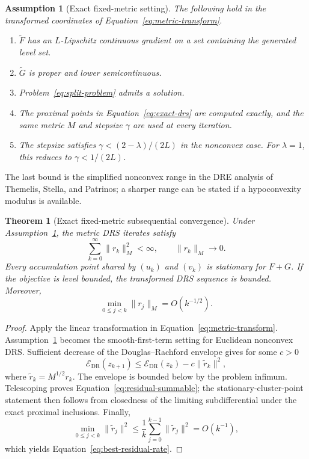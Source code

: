 \documentclass[11pt]{article}
\newtheorem{assumption}{Assumption}
\newtheorem{theorem}{Theorem}
\newcommand{\Edr}{\mathcal{E}_{\mathrm{DR}}}
\newcommand{\normM}[1]{\lVert #1\rVert_M}
\begin{document}
\begin{assumption}[Exact fixed-metric setting]
\label{ass:exact}
The following hold in the transformed coordinates of
Equation~\eqref{eq:metric-transform}.
\begin{enumerate}
  \item $\widetilde F$ has an $L$-Lipschitz continuous gradient on a set
        containing the generated level set.
  \item $\widetilde G$ is proper and lower semicontinuous.
  \item Problem~\eqref{eq:split-problem} admits a solution.
  \item The proximal points in Equation~\eqref{eq:exact-drs} are computed
        exactly, and the same metric $M$ and stepsize $\gamma$ are used at
        every iteration.
  \item The stepsize satisfies $\gamma<(2-\lambda)/(2L)$ in the nonconvex
        case.  For $\lambda=1$, this reduces to $\gamma<1/(2L)$.
\end{enumerate}
\end{assumption}

The last bound is the simplified nonconvex range in the DRE analysis of
Themelis, Stella, and Patrinos; a sharper range can be stated if a
hypoconvexity modulus is available.

\begin{theorem}[Exact fixed-metric subsequential convergence]
\label{thm:exact}
Under Assumption~\ref{ass:exact}, the metric DRS iterates satisfy
\begin{equation}
  \sum_{k=0}^{\infty}\normM{r_k}^2<\infty,
  \qquad
  \normM{r_k}\to0.
  \label{eq:residual-summable}
\end{equation}
Every accumulation point shared by $(u_k)$ and $(v_k)$ is stationary for
$F+G$.  If the objective is level bounded, the transformed DRS sequence is
bounded.  Moreover,
\begin{equation}
  \min_{0\leq j<k}\normM{r_j}
  =O(k^{-1/2}).
  \label{eq:best-residual-rate}
\end{equation}
\end{theorem}

\begin{proof}
Apply the linear transformation in Equation~\eqref{eq:metric-transform}.
Assumption~\ref{ass:exact} becomes the smooth-first-term setting for Euclidean
nonconvex DRS.  Sufficient decrease of the Douglas--Rachford envelope gives
for some $c>0$
\begin{equation}
  \Edr(z_{k+1})
  \leq \Edr(z_k)-c\lVert \widetilde r_k\rVert^2,
\end{equation}
where $\widetilde r_k=M^{1/2}r_k$.  The envelope is bounded below by the
problem infimum.  Telescoping proves
Equation~\eqref{eq:residual-summable}; the stationary-cluster-point statement
then follows from closedness of the limiting subdifferential under the exact
proximal inclusions.  Finally,
\begin{equation}
  \min_{0\leq j<k}\lVert\widetilde r_j\rVert^2
  \leq \frac{1}{k}\sum_{j=0}^{k-1}
  \lVert\widetilde r_j\rVert^2=O(k^{-1}),
\end{equation}
which yields Equation~\eqref{eq:best-residual-rate}.
\end{proof}
\end{document}

